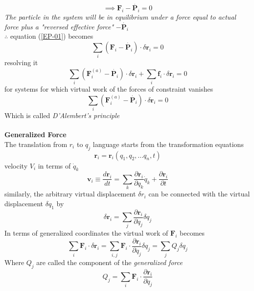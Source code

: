 $$\implies \textbf{F}_i-\dot{\textbf{P}_i}=0$$
\textit{The particle in the system will be in equilibrium under a force equal to actual force plus a "reversed effective force"} $-\dot{\textbf{P}_i}$\\
$\therefore$ equation (\ref{EP-01}) becomes
\begin{equation}
\sum\limits_{i}(\textbf{F}_i-\dot{\textbf{P}_i})\cdot\delta \textbf{r}_i=0 \label{EP-05}
\end{equation}
resolving it
$$\sum\limits_{i}(\textbf{F}_i^{(a)}-\dot{\textbf{P}_i})\cdot\delta \textbf{r}_i+\sum\limits_{i}\textbf{f}_i\cdot\delta \textbf{r}_i=0$$
for systems for which virtual work of the forces of constraint vanishes
\begin{equation}
\sum\limits_{i}(\textbf{F}_i^{(a)}-\dot{\textbf{P}_i})\cdot\delta\label{EP-06} \textbf{r}_i=0
\end{equation}
Which is called \textit{D'Alembert's principle}\\\\
\textbf{Generalized Force}\\
The translation from $r_i$ to $q_j$ language starts from the transformation equations
\begin{equation}
\textbf{r}_i=\textbf{r}_i(q_1,q_2,...q_n,t)\label{EP-07}
\end{equation}
velocity $V_i$ in terms of $\dot{q}_k$
\begin{equation}
\mathbf{v}_{i} \equiv \frac{d \mathbf{r}_{i}}{d t}=\sum_{k} \frac{\partial \mathbf{r}_{i}}{\partial q_{k}} \dot{q}_{k}+\frac{\partial \mathbf{r}_{i}}{\partial t}\label{EP-08}
\end{equation}
similarly, the arbitrary virtual displacement $\delta r_i$ can be connected with the virtual displacement $\delta q_1$ by
\begin{equation}
\delta \mathbf{r}_{i}=\sum_{j} \frac{\partial \mathbf{r}_{i}}{\partial q_{j}} \delta q_{j}
\end{equation}
In terms of generalized coordinates the virtual work of $\textbf{F}_i$ becomes
\begin{equation}
\sum_{i} \mathbf{F}_{i} \cdot \delta \mathbf{r}_{i}=\sum_{i, j} \mathbf{F}_{i} \cdot \frac{\partial \mathbf{r}_{i}}{\partial q_{j}} \delta q_{j}=\sum_{j} Q_{j} \delta q_{j}\label{EP-10}
\end{equation}
Where $Q_j$ are called the component of the \textit{generalized force} 
\begin{equation}
Q_{j}=\sum_{i} \mathbf{F}_{i} \cdot \frac{\partial \mathbf{r}_{i}}{\partial q_{j}}\label{EP-11}
\end{equation}
